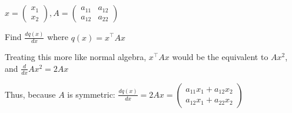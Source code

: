 \documentclass{article}
\begin{document}
\section{}
$x = \begin{pmatrix} x_1 \\ x_2 \end{pmatrix}, A = \begin{pmatrix} a_{11} & a_{12} \\ a_{12} & a_{22} \end{pmatrix}$

Find $\frac{d q(x)}{dx}$ where $q(x) = x^{\top}Ax$

Treating this more like normal algebra, $x^{\top}Ax$ would be the equivalent to $Ax^2$, and $\frac{d}{dx} Ax^2 = 2Ax$

Thus, because $A$ is symmetric: 
$\frac{d q(x)}{dx} = 2Ax = \begin{pmatrix} a_{11}x_1+a_{12}x_2 \\ a_{12}x_1+a_{22}x_2 \end{pmatrix}$ 
\end{document}
